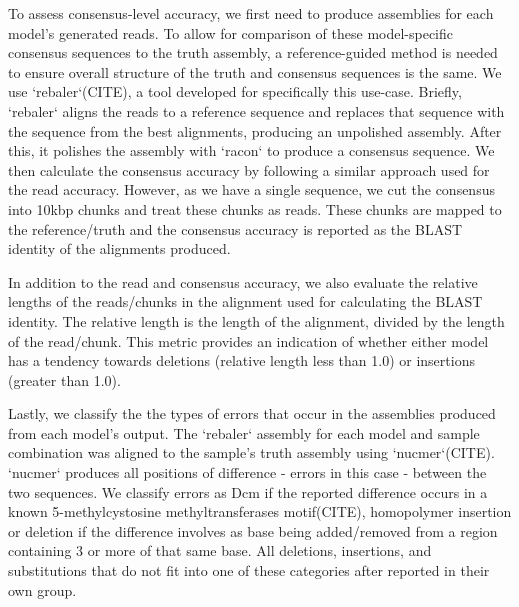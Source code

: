 \begin{markdown}
To assess consensus-level accuracy, we first need to produce assemblies for each model's generated reads. To allow for comparison of these model-specific consensus sequences to the truth assembly, a reference-guided method is needed to ensure overall structure of the truth and consensus sequences is the same. We use `rebaler`(CITE), a tool developed for specifically this use-case. Briefly, `rebaler` aligns the reads to a reference sequence and replaces that sequence with the sequence from the best alignments, producing an unpolished assembly. After this, it polishes the assembly with `racon` to produce a consensus sequence. We then calculate the consensus accuracy by following a similar approach used for the read accuracy. However, as we have a single sequence, we cut the consensus into 10kbp chunks and treat these chunks as reads. These chunks are mapped to the reference/truth and the consensus accuracy is reported as the BLAST identity of the alignments produced.  

In addition to the read and consensus accuracy, we also evaluate the relative lengths of the reads/chunks in the alignment used for calculating the BLAST identity. The relative length is the length of the alignment, divided by the length of the read/chunk. This metric provides an indication of whether either model has a tendency towards deletions (relative length less than 1.0) or insertions (greater than 1.0).  

Lastly, we classify the the types of errors that occur in the assemblies produced from each model's output. The `rebaler` assembly for each model and sample combination was aligned to the sample's truth assembly using `nucmer`(CITE). `nucmer` produces all positions of difference - errors in this case - between the two sequences. We classify errors as Dcm if the reported difference occurs in a known 5-methylcystosine methyltransferases motif(CITE), homopolymer insertion or deletion if the difference involves as base being added/removed from a region containing 3 or more of that same base. All deletions, insertions, and substitutions that do not fit into one of these categories after reported in their own group.

\end{markdown}
